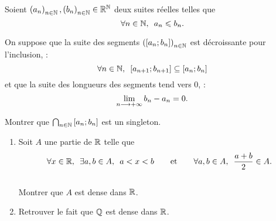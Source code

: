\begin{corr}
\end{corr}

\begin{exo}
Soient \(\left(a_n\right)_{n\in\mathbb{N}},\left(b_n\right)_{n\in\mathbb{N}}\in\mathbb{R}^{\mathbb{N}}\) deux suites réelles telles que \[\quantifs{\forall n\in\N}a_n\leq b_n.\]

On suppose que la suite des segments \(\left(\left[a_n;b_n\right]\right)_{n\in\mathbb{N}}\) est décroissante pour l'inclusion, \cad : \[\quantifs{\forall n\in\N}\intervii{a_{n+1}}{b_{n+1}}\subset\intervii{a_n}{b_n}\] et que la suite des longueurs des segments tend vers \(0\), \cad : \[\lim_{n\longrightarrow+\infty}b_n-a_n=0.\]

Montrer que \(\bigcap_{n\in\mathbb{N}}\left[a_n;b_n\right]\) est un singleton.
\end{exo}

\begin{corr}
\end{corr}

\begin{exo}
\begin{enumerate}
\item Soit \(A\) une partie de \(\mathbb{R}\) telle que \[\quantifs{\forall x\in\R;\exists a,b\in A}a<x<b\qquad\text{et}\qquad\quantifs{\forall a,b\in A}\dfrac{a+b}{2}\in A.\] \\

Montrer que \(A\) est dense dans \(\mathbb{R}\). \\

\item Retrouver le fait que \(\mathbb{Q}\) est dense dans \(\mathbb{R}\).
\end{enumerate}
\end{exo}

\begin{corr}
\end{corr}

